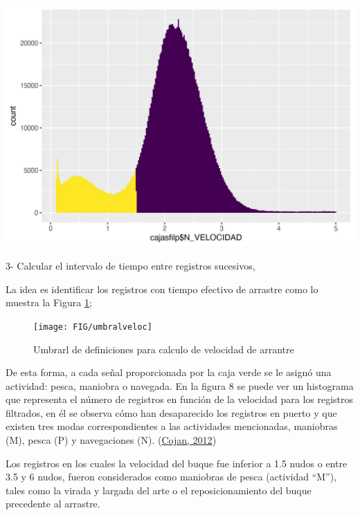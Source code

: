 \documentclass[
]{article}
\begin{document}
\begin{center}\includegraphics{SAR_Method_files/figure-latex/unnamed-chunk-20-1} \end{center}

3- Calcular el intervalo de tiempo entre registros sucesivos,

La idea es identificar los registros con tiempo efectivo de arrastre como lo muestra la Figura \ref{fig:esq};

\begin{figure}

{\centering \texttt{[image: FIG/umbralveloc]} 

}

\caption{\label{esq}Umbrarl de definiciones para calculo de velocidad de arrantre}\label{fig:esq}
\end{figure}

De esta forma, a cada señal proporcionada por la caja verde se le asignó una actividad: pesca, maniobra o navegada. En la figura 8 se puede ver un histograma que representa el número de registros en función de la velocidad para los registros filtrados, en él se observa cómo han desaparecido los registros en puerto y que existen tres modas correspondientes a las actividades mencionadas, maniobras (M), pesca (P) y navegaciones (N). (\protect\hyperlink{ref-Cohan2012}{Cojan, 2012})

Los registros en los cuales la velocidad del buque fue inferior a 1.5 nudos o entre 3.5 y 6 nudos, fueron considerados como maniobras de pesca (actividad ``M''), tales como la virada y largada del arte o el reposicionamiento del buque precedente al arrastre.
\end{document}
